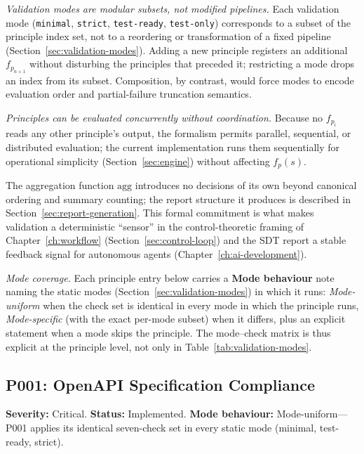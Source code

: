 \textit{Validation modes are modular subsets, not modified pipelines.} Each validation mode (\texttt{minimal}, \texttt{strict}, \texttt{test-ready}, \texttt{test-only}) corresponds to a subset of the principle index set, not to a reordering or transformation of a fixed pipeline (Section~\ref{sec:validation-modes}). Adding a new principle registers an additional $f_{p_{n+1}}$ without disturbing the principles that preceded it; restricting a mode drops an index from its subset. Composition, by contrast, would force modes to encode evaluation order and partial-failure truncation semantics.

\textit{Principles can be evaluated concurrently without coordination.} Because no $f_{p_i}$ reads any other principle's output, the formalism permits parallel, sequential, or distributed evaluation; the current implementation runs them sequentially for operational simplicity (Section~\ref{sec:engine}) without affecting $f_p(s)$.

The aggregation function $\mathrm{agg}$ introduces no decisions of its own beyond canonical ordering and summary counting; the report structure it produces is described in Section~\ref{sec:report-generation}. This formal commitment is what makes validation a deterministic ``sensor'' in the control-theoretic framing of Chapter~\ref{ch:workflow} (Section~\ref{sec:control-loop}) and the SDT report a stable feedback signal for autonomous agents (Chapter~\ref{ch:ai-development}).

\textit{Mode coverage.} Each principle entry below carries a \textbf{Mode behaviour} note naming the static modes (Section~\ref{sec:validation-modes}) in which it runs: \emph{Mode-uniform} when the check set is identical in every mode in which the principle runs, \emph{Mode-specific} (with the exact per-mode subset) when it differs, plus an explicit statement when a mode skips the principle. The mode--check matrix is thus explicit at the principle level, not only in Table~\ref{tab:validation-modes}.

\subsection{P001: OpenAPI Specification Compliance}
\label{subsec:p001}

\textbf{Severity:} Critical. \textbf{Status:} Implemented. \textbf{Mode behaviour:} Mode-uniform---P001 applies its identical seven-check set in every static mode (minimal, test-ready, strict).

